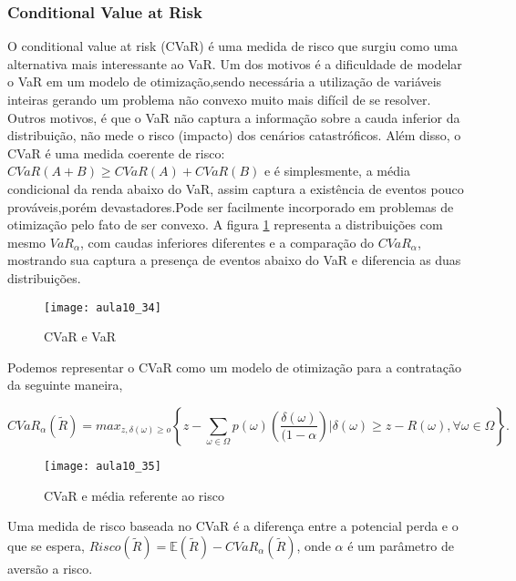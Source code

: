 \subsubsection{Conditional Value at Risk} 

    O conditional value at risk  (CVaR) é uma medida de risco que surgiu como uma alternativa mais interessante ao VaR. Um dos motivos é a dificuldade de modelar o VaR em um modelo de otimização,sendo necessária a utilização de variáveis inteiras gerando um problema não
convexo muito mais difícil de se resolver. Outros motivos, é que o VaR não captura a informação sobre a  cauda inferior da distribuição, não mede o risco (impacto) dos cenários catastróficos. Além disso, o CVaR é uma medida coerente de risco:$CVaR(A+B)\geq CVaR(A)+CVaR(B)$ e é simplesmente, a média condicional da renda abaixo do VaR, assim captura a existência de eventos pouco prováveis,porém devastadores.Pode ser facilmente incorporado em problemas de otimização pelo fato de ser convexo.
A figura \ref{fig:aula10_34} representa a distribuições com mesmo $VaR_{\alpha}$, com caudas
inferiores diferentes e a comparação do $CVaR_{\alpha}$, mostrando sua captura a presença de eventos abaixo do VaR e diferencia as duas distribuições.

\begin{figure}[H]
\begin{centering}
\texttt{[image: aula10\_34]}\protect\caption{\label{fig:aula10_34} CVaR e VaR}
\end{centering}
\end{figure}

Podemos representar o CVaR como um modelo de otimização para a contratação da seguinte maneira,

\[
CVaR_{\alpha}(\tilde{R})=max_{z,\delta(\omega)\geq o}\left\{ z-\sum_{\omega\in\varOmega}p(\omega)\left(\frac{\delta(\omega)}{(1-\alpha}\right)|\delta(\omega)\geq z-R(\omega),\forall\omega\in\varOmega\right\} .
\]
\begin{figure}[H]
\begin{centering}
\texttt{[image: aula10\_35]}\protect\caption{\label{fig:aula10_35} CVaR e média referente ao risco}
\end{centering}
\end{figure}

Uma medida de risco baseada no CVaR é a diferença entre a potencial perda e o que se espera,
$Risco(\tilde{R})=\mathbb{E}(\tilde{R})-CVaR_{\alpha}(\tilde{R})$, onde $\alpha$ é um parâmetro de aversão a risco.

